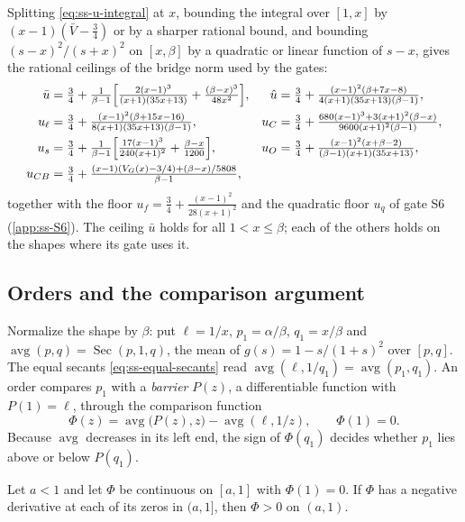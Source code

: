  Splitting \eqref{eq:ss-u-integral} at $x$, bounding the integral over
$[1,x]$ by $(x-1)(\bar V-\frac34)$ or by a sharper rational bound, and bounding $(s-x)^2/(s+x)^2$
on $[x,\beta]$ by a quadratic or linear function of $s-x$, gives the rational ceilings of the
bridge norm used by the gates:
\begin{align*}
  \bar u&=\tfrac34+\tfrac{1}{\beta-1}\Bigl[\tfrac{2(x-1)^3}{(x+1)(35x+13)}
   +\tfrac{(\beta-x)^3}{48x^2}\Bigr],&
  \hat u&=\tfrac34+\tfrac{(x-1)^2(\beta+7x-8)}{4(x+1)(35x+13)(\beta-1)},\\
  u_\ell&=\tfrac34+\tfrac{(x-1)^2(\beta+15x-16)}{8(x+1)(35x+13)(\beta-1)},&
  u_C&=\tfrac34+\tfrac{680(x-1)^3+3(x+1)^2(\beta-x)}{9600(x+1)^2(\beta-1)},\\
  u_s&=\tfrac34+\tfrac{1}{\beta-1}\Bigl[\tfrac{17(x-1)^3}{240(x+1)^2}+\tfrac{\beta-x}{1200}\Bigr],&
  u_O&=\tfrac34+\tfrac{(x-1)^2(x+\beta-2)}{(\beta-1)(x+1)(35x+13)},\\
  u_{CB}&=\tfrac34+\tfrac{(x-1)(V_G(x)-3/4)+(\beta-x)/5808}{\beta-1},
\end{align*}
together with the floor $u_f=\frac34+\frac{(x-1)^2}{28(x+1)^2}$ and the quadratic floor $u_q$ of
gate S6 (\cref{app:ss-S6}). The ceiling $\bar u$ holds for all $1<x\le\beta$; each of the others
holds on the shapes where its gate uses it.

\subsection{Orders and the comparison argument}\label{app:ss-orders}

Normalize the shape by $\beta$: put $\ell=1/x$, $p_1=\alpha/\beta$, $q_1=x/\beta$ and
$\operatorname{avg}(p,q)=\operatorname{Sec}(p,1,q)$, the mean of $g(s)=1-s/(1+s)^2$ over $[p,q]$.
The equal secants \eqref{eq:ss-equal-secants} read
$\operatorname{avg}(\ell,1/q_1)=\operatorname{avg}(p_1,q_1)$. An order compares $p_1$ with a
\emph{barrier} $P(z)$, a differentiable function with $P(1)=\ell$, through the comparison function
\[
  \Phi(z)=\operatorname{avg}\bigl(P(z),z\bigr)-\operatorname{avg}(\ell,1/z),\qquad\Phi(1)=0 .
\]
Because $\operatorname{avg}$ decreases in its left end, the sign of $\Phi(q_1)$ decides whether
$p_1$ lies above or below $P(q_1)$.

\begin{lemma}\label{lem:ss-first-contact}
Let $a<1$ and let $\Phi$ be continuous on $[a,1]$ with $\Phi(1)=0$. If $\Phi$ has a negative
derivative at each of its zeros in $(a,1]$, then $\Phi>0$ on $(a,1)$.
\end{lemma}

